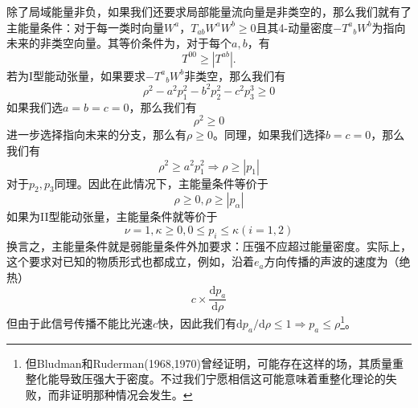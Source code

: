 \documentclass[hyperref, UTF8, a4paper]{ctexart}
\begin{document}
除了局域能量非负，如果我们还要求局部能量流向量是非类空的，那么我们就有了主能量条件：对于每一类时向量$W^{a}$，$T_{ab} W^{a} W^{b} \geq 0$且其4-动量密度$-T^{a}{}_{b} W^{b}$为指向未来的非类空向量。其等价条件为，对于每个$a,b$，有
\begin{equation*}
	T^{00} \geq \left| T^{ab}\right| .
\end{equation*}
若为I型能动张量，如果要求$-T^{a}{}_{b} W^{b}$非类空，那么我们有
\begin{equation*}
	\rho ^{2} -a^{2} p_{1}^{2} -b^{2} p_{2}^{2} -c^{2} p_{3}^{3} \geq 0
\end{equation*}
如果我们选$a=b=c=0$，那么我们有
\begin{equation*}
	\rho ^{2} \geq 0
\end{equation*}
进一步选择指向未来的分支，那么有$\rho \geq 0$。同理，如果我们选择$b=c=0$，那么我们有
\begin{equation*}
	\rho ^{2} \geq a^{2} p_{1}^{2} \Rightarrow \rho \geq | p_{1}| 
\end{equation*}
对于$p_{2} ,p_{3}$同理。因此在此情况下，主能量条件等价于
\begin{equation*}
	\rho \geq 0,\rho \geq | p_{\alpha }| 
\end{equation*}
如果为II型能动张量，主能量条件就等价于
\begin{equation*}
	\nu =1,\kappa \geq 0,0\leq p_{i} \leq \kappa ( i=1,2)
\end{equation*}
换言之，主能量条件就是弱能量条件外加要求：压强不应超过能量密度。实际上，这个要求对已知的物质形式也都成立，例如，沿着$e_{a}$方向传播的声波的速度为（绝热）
\begin{equation*}
	c\times \frac{\mathrm{d} p_{a}}{\mathrm{d} \rho }
\end{equation*}
但由于此信号传播不能比光速$c$快，因此我们有$\mathrm{d} p_{a} /\mathrm{d} \rho \leq 1\Rightarrow p_{a} \leq \rho $\footnote{但Bludman和Ruderman(1968,1970)曾经证明，可能存在这样的场，其质量重整化能导致压强大于密度。不过我们宁愿相信这可能意味着重整化理论的失败，而非证明那种情况会发生。}。
\end{document}
